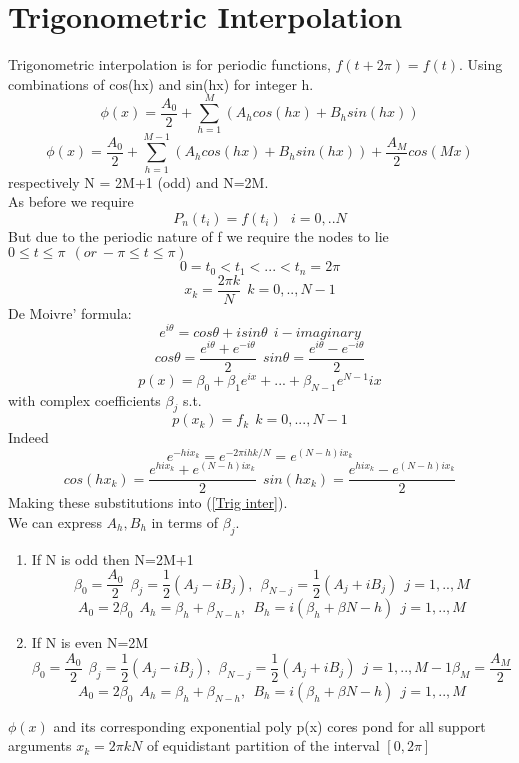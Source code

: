 \section{Trigonometric Interpolation}
Trigonometric interpolation is for periodic functions, $f(t+2\pi)=f(t)$.
Using combinations of cos(hx) and sin(hx) for integer h.
\begin{equation}
\label{Trig inter}
\phi(x) = \frac{A_0}{2} + \sum_{h=1}^M(A_{h}cos(hx) + B_h sin(hx))
\end{equation}
\begin{equation}
\phi(x) = \frac{A_0}{2} + \sum_{h=1}^{M-1}(A_{h}cos(hx) + B_h sin(hx)) +\frac{A_M}{2}cos(Mx)
\end{equation}
respectively N = 2M+1 (odd) and N=2M.\\
As before we require
\[P_{n}(t_i)=f(t_i) \ \ \ i=0,..N \]
But due to the periodic nature of f we require the nodes to lie
$0\leq t \leq \pi \ \ (or \ -\pi \leq t \leq \pi)$
\[0=t_0 < t_1 < ... < t_n = 2 \pi \]
\[x_k = \frac{2\pi k}{N} \ \ k=0,..,N-1 \]
De Moivre' formula:
\[
e^{i\theta}=cos\theta+isin\theta \ \ i-imaginary
\]
\[cos\theta =\frac{ e^{i\theta}  +e^{-i\theta}}{2} \ \ sin\theta = \frac{ e^{i\theta}  -e^{-i\theta}}{2}
\]
\begin{equation}
p(x) = \beta_0+\beta_1 e^{ix}+...+\beta_{N-1}e^{N-1}ix
\end{equation}
with complex coefficients $\beta_j$ s.t.
\[p(x_k)=f_k \ \ k=0,...,N-1 \]
Indeed 
\[
e^{-hix_k}=
e^{-2\pi ihk/N}=
e^{(N-h)ix_k}
\]
\[
cos(hx_k) = \frac{ e^{hix_k}  +e^{(N-h)ix_k}}{2}
\ \ sin(hx_k) = \frac{ e^{hix_k}  -e^{(N-h)ix_k}}{2}
\]
Making these substitutions into (\ref{Trig inter}).\\
We can express $A_h,B_h$ in terms of $\beta_j$.
\begin{enumerate}
\item
If N is odd then N=2M+1
\[\beta_0=\frac{A_0}{2} \ \ \beta_j=\frac{1}{2}(A_j-iB_j), \ \ \beta_{N-j}=\frac{1}{2}(A_j+iB_j) \ \ j=1,..,M
\]
\[A_0=2\beta_0 \ \  A_h=\beta_h+\beta_{N-h}, \ \ B_{h}=i(\beta_h+\beta{N-h}) \ \ j=1,..,M
\]
\item
If N is even N=2M
\[\beta_0=\frac{A_0}{2} \ \ \beta_j=\frac{1}{2}(A_j-iB_j), \ \ \beta_{N-j}=\frac{1}{2}(A_j+iB_j) \ \ j=1,..,M-1 \beta_{M}=\frac{A_{M}}{2}
\]
\[A_0=2\beta_0 \ \ A_h=\beta_h+\beta_{N-h}, \ \ B_{h}=i(\beta_h+\beta{N-h}) \ \ j=1,..,M
\]
\end{enumerate}
$\phi(x)$ and its corresponding exponential poly p(x) cores pond for all support arguments $x_k=2\pi k N$ of equidistant partition of the interval $[0,2\pi]$
